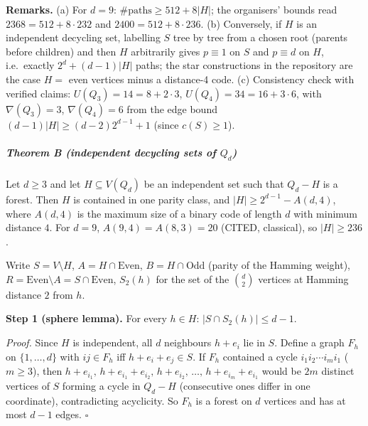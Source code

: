\textbf{Remarks.} (a) For \(d=9\): \(\#\text{paths}\ge 512+8|H|\); the
organisers' bounds read \(2368=512+8\cdot232\) and
\(2400=512+8\cdot236\). (b) Conversely, if \(H\) is an independent
decycling set, labelling \(S\) tree by tree from a chosen root (parents
before children) and then \(H\) arbitrarily gives \(p\equiv1\) on \(S\)
and \(p\equiv d\) on \(H\), i.e.~exactly \(2^d+(d-1)|H|\) paths; the
star constructions in the repository are the case \(H=\) even vertices
minus a distance-4 code. (c) Consistency check with verified claims:
\(U(Q_3)=14=8+2\cdot3\), \(U(Q_4)=34=16+3\cdot6\), with
\(\nabla(Q_3)=3\), \(\nabla(Q_4)=6\) from the edge bound
\((d-1)|H|\ge(d-2)2^{d-1}+1\) (since \(c(S)\ge1\)).

\subparagraph{\texorpdfstring{Theorem B (independent decycling sets of
\(Q_d\))}{Theorem B (independent decycling sets of Q\_d)}}\label{theorem-b-independent-decycling-sets-of-q_d}

Let \(d\ge3\) and let \(H\subseteq V(Q_d)\) be an independent set such
that \(Q_d-H\) is a forest. Then \(H\) is contained in one parity class,
and \(|H|\ge 2^{d-1}-A(d,4)\), where \(A(d,4)\) is the maximum size of a
binary code of length \(d\) with minimum distance \(4\). For \(d=9\),
\(A(9,4)=A(8,3)=20\) (CITED, classical), so \(|H|\ge236\).

Write \(S=V\setminus H\), \(A=H\cap\text{Even}\), \(B=H\cap\text{Odd}\)
(parity of the Hamming weight),
\(R=\text{Even}\setminus A=S\cap\text{Even}\), \(S_2(h)\) for the set of
the \(\binom d2\) vertices at Hamming distance \(2\) from \(h\).

\textbf{Step 1 (sphere lemma).} For every \(h\in H\):
\(|S\cap S_2(h)|\le d-1\).

\emph{Proof.} Since \(H\) is independent, all \(d\) neighbours \(h+e_i\)
lie in \(S\). Define a graph \(F_h\) on \(\{1,\dots,d\}\) with
\(ij\in F_h\) iff \(h+e_i+e_j\in S\). If \(F_h\) contained a cycle
\(i_1i_2\cdots i_mi_1\) (\(m\ge3\)), then
\(h+e_{i_1},\,h+e_{i_1}+e_{i_2},\,h+e_{i_2},\,\dots,\,h+e_{i_m}+e_{i_1}\)
would be \(2m\) distinct vertices of \(S\) forming a cycle in \(Q_d-H\)
(consecutive ones differ in one coordinate), contradicting acyclicity.
So \(F_h\) is a forest on \(d\) vertices and has at most \(d-1\) edges.
\(\square\)

